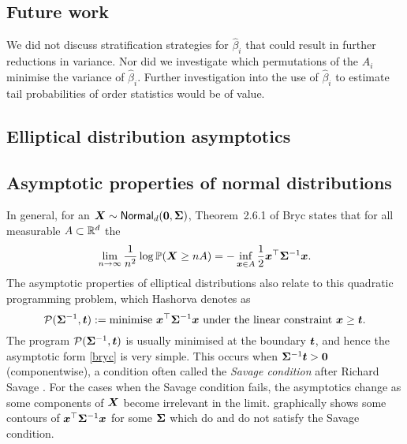 \subsection{Future work}

We did not discuss stratification strategies for $\hat{\beta}_i$ that could result in further reductions in variance. Nor did we investigate which permutations of the $A_i$ minimise the variance of $\hat{\beta}_i$. Further investigation into the use of $\hat{\beta}_i$ to estimate tail probabilities of order statistics would be of value.


\begin{subappendices}
\section{Elliptical distribution asymptotics} \label{scn:elliptical_asymptotics}

\subsection{Asymptotic properties of normal distributions}

In general, for an $\bm{X} \sim \mathsf{Normal}_d(\bm{0},\bm{\Sigma})$, Theorem~2.6.1 of Bryc \cite{bryc2012normal} states that for all measurable $A \subset \mathbb{R}^d$ the
\begin{equation} \label{bryc}
\lim_{n \to \infty} \frac1{n^2} \log \operatorname{{\mathbb P}}(\bm{X} \ge nA) = - \inf_{\bm{x} \in A} \frac12 \bm{x}^\top \bm{\Sigma}^{-1} \bm{x}.
\end{equation}
The asymptotic properties of elliptical distributions also relate to this quadratic programming problem, which Hashorva \cite{hashorva2005asymptotics,hashorva2007asymptotic} denotes as
\begin{equation} \label{quad_prog}
\mathcal{P}(\bm{\Sigma}^{-1}, \bm{t}) := \text{minimise } \bm{x}^\top \bm{\Sigma}^{-1} \bm{x} \text{ under the linear constraint } \bm{x} \ge \bm{t}.
\end{equation}
The program $\mathcal{P}(\bm{\Sigma}^{-1}, \bm{t})$ is usually minimised at the boundary $\bm{t}$, and hence the asymptotic form \eqref{bryc} is very simple. This occurs when
$\bm{\Sigma}^{-1} \bm{t} > \bm{0}$ (componentwise), a condition often called the \emph{Savage condition} after Richard Savage \cite{savage1962mills}. For the cases when the Savage condition fails, the asymptotics change as some components of $\bm{X}$ become irrelevant in the limit.  graphically shows some contours of $\bm{x}^\top \bm{\Sigma}^{-1} \bm{x}$ for some $\bm{\Sigma}$ which do and do not satisfy the Savage condition.


\end{subappendices}
